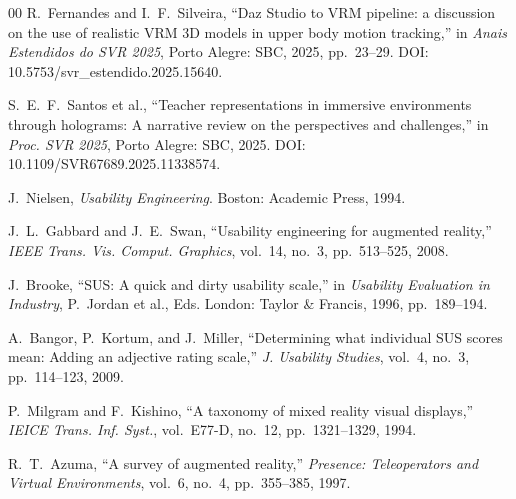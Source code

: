 \documentclass[conference]{IEEEtran}
\begin{document}
\begin{thebibliography}{00}
R.~Fernandes and I.~F.~Silveira, ``Daz Studio to VRM pipeline: a discussion on
the use of realistic VRM 3D models in upper body motion tracking,'' in
\textit{Anais Estendidos do SVR 2025}, Porto Alegre: SBC, 2025, pp.~23--29.
DOI: 10.5753/svr\_estendido.2025.15640.

S.~E.~F.~Santos et al., ``Teacher representations in immersive environments
through holograms: A narrative review on the perspectives and challenges,'' in
\textit{Proc. SVR 2025}, Porto Alegre: SBC, 2025.
DOI: 10.1109/SVR67689.2025.11338574.

J.~Nielsen, \textit{Usability Engineering}. Boston: Academic Press, 1994.

J.~L.~Gabbard and J.~E.~Swan, ``Usability engineering for augmented reality,''
\textit{IEEE Trans. Vis. Comput. Graphics}, vol.~14, no.~3, pp.~513--525, 2008.

J.~Brooke, ``SUS: A quick and dirty usability scale,'' in \textit{Usability
Evaluation in Industry}, P.~Jordan et al., Eds. London: Taylor \& Francis,
1996, pp.~189--194.

A.~Bangor, P.~Kortum, and J.~Miller, ``Determining what individual SUS scores
mean: Adding an adjective rating scale,'' \textit{J. Usability Studies},
vol.~4, no.~3, pp.~114--123, 2009.

P.~Milgram and F.~Kishino, ``A taxonomy of mixed reality visual displays,''
\textit{IEICE Trans. Inf. Syst.}, vol.~E77-D, no.~12, pp.~1321--1329, 1994.

R.~T.~Azuma, ``A survey of augmented reality,'' \textit{Presence: Teleoperators
and Virtual Environments}, vol.~6, no.~4, pp.~355--385, 1997.

\end{thebibliography}
\end{document}
